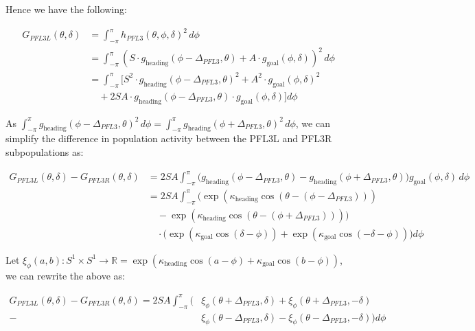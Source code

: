 \documentclass[11pt]{article}
\begin{document}
Hence we have the following:

\begin{equation}
\begin{aligned}
G_{PFL3L}(\theta, \delta) &= \int_{-\pi}^{\pi} h_{PFL3}(\theta, \phi, \delta)^2 \, d\phi \\
&= \int_{-\pi}^{\pi} (S \cdot g_{\text{heading}}(\phi - \Delta_{PFL3}, \theta) + A \cdot g_{\text{goal}}(\phi, \delta))^2 \, d\phi \\
&= \int_{-\pi}^{\pi} \big[ S^2 \cdot g_{\text{heading}}(\phi - \Delta_{PFL3}, \theta)^2 + A^2 \cdot g_{\text{goal}}(\phi, \delta)^2 \\
&\quad + 2SA \cdot g_{\text{heading}}(\phi - \Delta_{PFL3}, \theta) \cdot g_{\text{goal}}(\phi, \delta) \big] d\phi
\end{aligned}
\end{equation}

As $\int_{-\pi}^{\pi} g_{\text{heading}}(\phi - \Delta_{PFL3}, \theta)^2 \, d\phi = \int_{-\pi}^{\pi} g_{\text{heading}}(\phi + \Delta_{PFL3}, \theta)^2 \, d\phi$, we can simplify the difference in population activity between the PFL3L and PFL3R subpopulations as:

\begin{equation}
\begin{aligned}
G_{PFL3L}(\theta, \delta) - G_{PFL3R}(\theta, \delta) &= 2SA \int_{-\pi}^{\pi} \big( g_{\text{heading}}(\phi - \Delta_{PFL3}, \theta) - g_{\text{heading}}(\phi + \Delta_{PFL3}, \theta) \big) g_{\text{goal}}(\phi, \delta)\, d\phi \\
&= 2SA \int_{-\pi}^{\pi} \big( \exp(\kappa_{\text{heading}} \cos(\theta - (\phi - \Delta_{PFL3}))) \\
&\quad - \exp(\kappa_{\text{heading}} \cos(\theta - (\phi + \Delta_{PFL3}))) \big) \\
&\quad \cdot \big( \exp(\kappa_{\text{goal}} \cos(\delta - \phi)) + \exp(\kappa_{\text{goal}} \cos(-\delta - \phi)) \big) d\phi
\end{aligned}
\end{equation}

Let $\xi_\phi(a, b): S^1 \times S^1 \to \mathbb{R} = \exp(\kappa_{\text{heading}} \cos(a - \phi) + \kappa_{\text{goal}} \cos(b - \phi))$, we can rewrite the above as:

\begin{equation}
\begin{aligned}
G_{PFL3L}(\theta, \delta) - G_{PFL3R}(\theta, \delta) = 2SA \int_{-\pi}^{\pi} \big( &\xi_\phi(\theta + \Delta_{PFL3}, \delta) + \xi_\phi(\theta + \Delta_{PFL3}, -\delta) \\
- &\xi_\phi(\theta - \Delta_{PFL3}, \delta) - \xi_\phi(\theta - \Delta_{PFL3}, -\delta) \big) d\phi
\end{aligned}
\end{equation}
\end{document}
